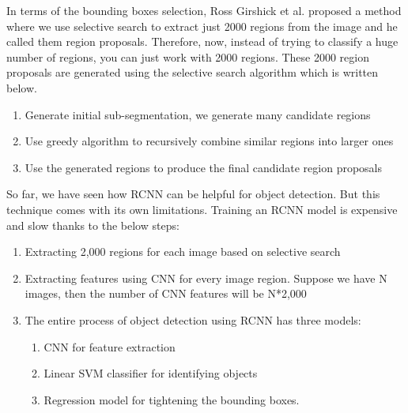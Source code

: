 \documentclass[twoside]{article}
\begin{document}
In terms of the bounding boxes selection, Ross Girshick et al. proposed a method\cite{DBLP:journals/corr/GirshickDDM13} where we use selective search to extract just 2000 regions from the image and he called them region proposals. Therefore, now, instead of trying to classify a huge number of regions, you can just work with 2000 regions. These 2000 region proposals are generated using the selective search algorithm which is written below.
\begin{enumerate}
    \item Generate initial sub-segmentation, we generate many candidate regions
    \item Use greedy algorithm to recursively combine similar regions into larger ones 
    \item Use the generated regions to produce the final candidate region proposals
\end{enumerate}
So far, we have seen how RCNN can be helpful for object detection. But this technique comes with its own limitations. Training an RCNN model is expensive and slow thanks to the below steps:
\begin{enumerate}
    \item Extracting 2,000 regions for each image based on selective search
    \item Extracting features using CNN for every image region. Suppose we have N images, then the number of CNN features will be N*2,000
    \item The entire process of object detection using RCNN has three models: 
    \begin{enumerate}
        \item CNN for feature extraction
        \item Linear SVM classifier for identifying objects
        \item Regression model for tightening the bounding boxes.
    \end{enumerate}
\end{enumerate}
\end{document}
